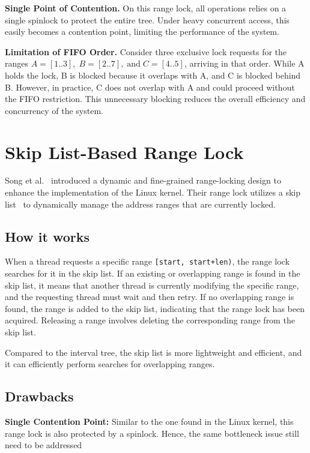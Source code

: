 \textbf{Single Point of Contention.}
On this range lock, all operations relies on a single spinlock to protect the entire tree. 
Under heavy concurrent access, this easily becomes a contention point, limiting the performance of the system.
    
\textbf{Limitation of FIFO Order.} 
Consider three exclusive lock requests for the ranges \( A = [1..3], \; B = [2..7], \; \text{and} \; C = [4..5] \), arriving in that order. While A holds the lock, B is blocked because it overlaps with A, and C is blocked behind B. 
However, in practice, C does not overlap with A and could proceed without the FIFO restriction. 
This unnecessary blocking reduces the overall efficiency and concurrency of the system.

\section{Skip List-Based Range Lock}

Song et al.~\parencite{song2013parallelizing} introduced a dynamic and fine-grained range-locking design to enhance the implementation of the Linux kernel. 
Their range lock utilizes a skip list~\parencite{pugh1990skip} to dynamically manage the address ranges that are currently locked.

\subsection*{How it works}

When a thread requests a specific range \texttt{[start, start+len)}, the range lock searches for it in the skip list. 
If an existing or overlapping range is found in the skip list, it means that another thread is currently modifying the specific range, and the requesting thread must wait and then retry. 
If no overlapping range is found, the range is added to the skip list, indicating that the range lock has been acquired. Releasing a range involves deleting the corresponding range from the skip list.

Compared to the interval tree, the skip list is more lightweight and efficient, and it can efficiently perform searches for overlapping ranges.

\subsection*{Drawbacks}

\textbf{Single Contention Point:} 
Similar to the one found in the Linux kernel, this range lock is also protected by a spinlock. Hence, the same bottleneck issue still need to be addressed  


